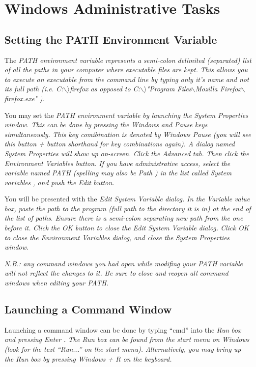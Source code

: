 
\chapter{Windows Administrative Tasks} 
\section{Setting the PATH Environment Variable}\label{path}
The \em PATH \em environment variable represents a semi-colon delimited (separated) list of all the paths in your computer where executable files are kept. This allows you to execute an executable from the command line by typing only it's name and not its full path (i.e. \em C:$\backslash$$\rangle$firefox \em as opposed to \em C:$\backslash$$\rangle$"Program Files$\backslash$Mozilla Firefox$\backslash$firefox.exe" \em).

You may set the \em PATH \em environment variable by launching the System Properties window. This can be done by pressing the \em Windows \em and \em Pause \em keys simultaneously. This key comibination is
denoted by \em Windows  Pause \em (you will see this \em button + button \em shorthand for key combinations again). A dialog named \em System Properties \em will show up on-screen. Click the \em Advanced \em tab. Then click the \em Environment Variables \em button. If you have administrative access, select the variable named \em PATH \em (spelling may also be \em Path \em) in the list called \em System variables \em, and push the \em Edit \em button.

You will be presented with the \em Edit System Variable \em dialog. In the \em Variable value \em box, paste the path to the program (full path to the directory it is in) at the end of the list of paths. Ensure there is a semi-colon separating new path from the one before it. Click the \em OK \em button to close the \em Edit System Variable \em dialog. Click \em OK \em to close the \em Environment Variables \em dialog, and close the \em System Properties \em window.

\em N.B.: any command windows you had open while modifing your PATH variable will not reflect the changes to it. Be sure to close and reopen all command windows when editing your PATH. \em

\section{Launching a Command Window}\label{launch-command-window}
Launching a command window can be done by typing ``cmd'' into the \em Run \em box and pressing \em Enter \em. The \em Run \em box can be found from the \em start \em menu on Windows (look for the text ``Run...'' on the start menu). Alternatively, you may bring up the \em Run \em box by pressing \em Windows + R \em on the keyboard.

